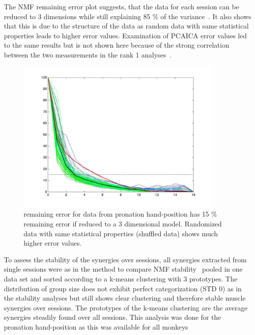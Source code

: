 The NMF remaining error plot suggests, that the data for each session can be reduced to 3 dimensions while still explaining 85 \% of the  variance~. It also shows that this is due to the structure of the data as random data with same statistical properties leads to higher error values. Examination of PCAICA error values led to the same results but is not shown here because of the strong correlation between the two measurements in the rank 1 analyses~.
\begin{figure}[ht]
	\centering
		\includegraphics[width=0.9\textwidth]{images/resid_test.jpg}
	\caption
	{
	remaining error for data from pronation hand-position has 15 \% remaining error if reduced to a 3 dimensional model. Randomized data with same statistical properties (shuffled data) shows much higher error values.
	}
	\label{sg:fig:images_all_resid_non}
\end{figure}

To assess the stability of the synergies over sessions, all synergies extracted from single sessions were as in the method to compare NMF stability~ pooled in one data set and sorted according to a k-means clustering with 3 prototypes. The distribution of group size does not exhibit perfect categorization (STD 0) as in the stability analyses but still shows clear clustering and therefore stable muscle synergies over sessions. The prototypes of the k-means clustering are the average synergies steadily found over all sessions. This analysis was done for the pronation hand-position as this was available for all monkeys


